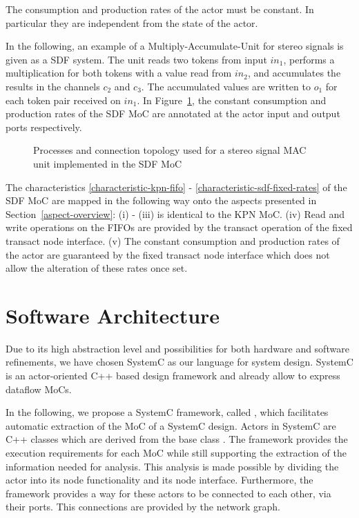 \begin{characteristic}\label{characteristic-sdf-fixed-rates}
The consumption and production rates of the actor must be constant.
In particular they are independent from the state of the actor.
\end{characteristic}

In the following, an example of a Multiply-Accumulate-Unit for stereo signals is given
as a SDF system. The unit reads two tokens from input $in_1$,
performs a multiplication for both tokens with a value read from $in_2$,
and accumulates the results in the channels $c_2$ and
$c_3$. The accumulated values are written to $o_1$ for each
token pair received on $in_1$.
In Figure~\ref{fig:sdf-mac-unit},
the constant consumption and production rates of the SDF
MoC are annotated at the actor input and output ports
respectively.

\begin{figure}[h]
\centering

\caption{Processes and connection topology used for a stereo signal MAC
  unit implemented in the SDF MoC}
\label{fig:sdf-mac-unit}
\end{figure}

The characteristics \ref{characteristic-kpn-fifo} -
\ref{characteristic-sdf-fixed-rates} of the SDF MoC are mapped in the following way
onto the aspects presented in Section~\ref{aspect-overview}: (i) - (iii) is identical
to the KPN MoC.
(iv) Read and write operations on the FIFOs are provided by the transact
operation of the fixed transact node interface.
(v) The constant consumption and production rates of the actor are
guaranteed by the fixed transact node interface which does
not allow the alteration of these rates once set.

\section{Software Architecture}\label{software-architecture}

Due to its high abstraction level and possibilities for both
hardware and software refinements, we have chosen SystemC
\cite{systemc-lrm:2003} \cite{glms:2002} as our language for system design.
SystemC is an actor-oriented C++ based design framework and
already allow to express dataflow MoCs. 

In the following, we propose a SystemC framework, called \SysteMoC, which
facilitates automatic extraction of the MoC of a SystemC design.
Actors in SystemC are C++ classes which are derived from the base class .
The \SysteMoC{} framework provides the execution requirements for each MoC while
still supporting the extraction of the information needed for analysis.
This analysis is made possible by dividing the actor into its
node functionality and its node interface.
Furthermore, the \SysteMoC{} framework provides a way for these
actors to be connected to each other, via their ports. This connections
are provided by the network graph.

